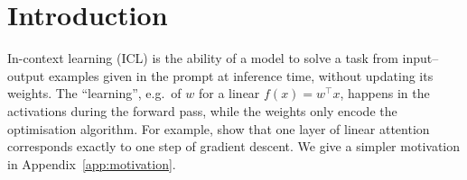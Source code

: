 \vspace{-0.5em}
\section{Introduction}
\vspace{-1em}
In-context learning (ICL) is the ability of a model to solve a task from input--output
examples given in the prompt at inference time, without updating its weights. The
``learning'', e.g.\ of $w$ for a linear $f(x)=w^\top x$, happens in the activations
during the forward pass, while the weights only encode the optimisation algorithm. For
example, \cite{vonOswald2023Transformers} show that one layer of linear attention
corresponds exactly to one step of gradient descent. We give a simpler motivation in
Appendix~\ref{app:motivation}.

